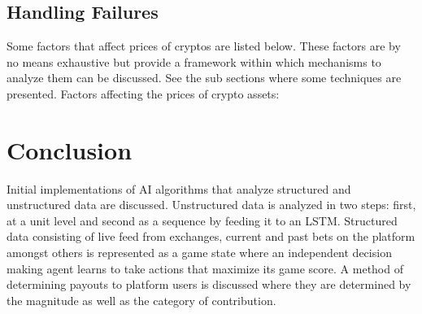 \documentclass[a4paper]{article}
\begin{document}
\subsection{Handling Failures}

Some factors that affect prices of cryptos are listed below. These factors are by no means exhaustive but provide a framework within which mechanisms to analyze them can be discussed. See the sub sections where some techniques are presented.
Factors affecting the prices of crypto assets:

\section{Conclusion}
Initial implementations of AI algorithms that analyze structured and unstructured data are discussed. Unstructured data is analyzed in two steps: first, at a unit level and second as a sequence by feeding it to an LSTM. Structured data consisting of live feed from exchanges, current and past bets on the platform amongst others is represented as a game state where an independent decision making agent learns to take actions that maximize its game score. A method of determining payouts to platform users is discussed where they are determined by the magnitude as well as the category of contribution.




\end{document}
